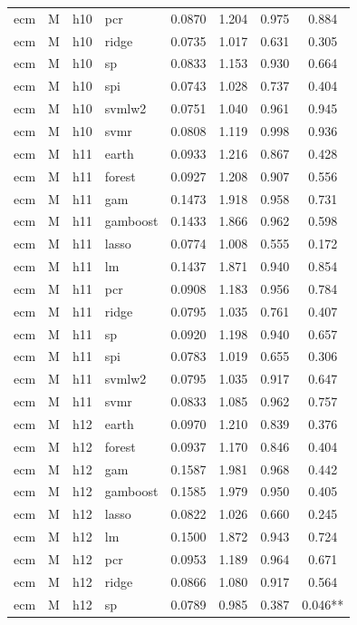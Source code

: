 \begin{ThreePartTable}
\begin{longtable}[t]{llclcccc}
ecm & M & h10 & pcr & 0.0870 & 1.204 & 0.975 & 0.884\\
ecm & M & h10 & ridge & 0.0735 & 1.017 & 0.631 & 0.305\\
ecm & M & h10 & sp & 0.0833 & 1.153 & 0.930 & 0.664\\
ecm & M & h10 & spi & 0.0743 & 1.028 & 0.737 & 0.404\\
ecm & M & h10 & svmlw2 & 0.0751 & 1.040 & 0.961 & 0.945\\
ecm & M & h10 & svmr & 0.0808 & 1.119 & 0.998 & 0.936\\
\addlinespace
ecm & M & h11 & earth & 0.0933 & 1.216 & 0.867 & 0.428\\
ecm & M & h11 & forest & 0.0927 & 1.208 & 0.907 & 0.556\\
ecm & M & h11 & gam & 0.1473 & 1.918 & 0.958 & 0.731\\
ecm & M & h11 & gamboost & 0.1433 & 1.866 & 0.962 & 0.598\\
ecm & M & h11 & lasso & 0.0774 & 1.008 & 0.555 & 0.172\\
ecm & M & h11 & lm & 0.1437 & 1.871 & 0.940 & 0.854\\
ecm & M & h11 & pcr & 0.0908 & 1.183 & 0.956 & 0.784\\
ecm & M & h11 & ridge & 0.0795 & 1.035 & 0.761 & 0.407\\
ecm & M & h11 & sp & 0.0920 & 1.198 & 0.940 & 0.657\\
ecm & M & h11 & spi & 0.0783 & 1.019 & 0.655 & 0.306\\
ecm & M & h11 & svmlw2 & 0.0795 & 1.035 & 0.917 & 0.647\\
ecm & M & h11 & svmr & 0.0833 & 1.085 & 0.962 & 0.757\\
\addlinespace
ecm & M & h12 & earth & 0.0970 & 1.210 & 0.839 & 0.376\\
ecm & M & h12 & forest & 0.0937 & 1.170 & 0.846 & 0.404\\
ecm & M & h12 & gam & 0.1587 & 1.981 & 0.968 & 0.442\\
ecm & M & h12 & gamboost & 0.1585 & 1.979 & 0.950 & 0.405\\
ecm & M & h12 & lasso & 0.0822 & 1.026 & 0.660 & 0.245\\
ecm & M & h12 & lm & 0.1500 & 1.872 & 0.943 & 0.724\\
ecm & M & h12 & pcr & 0.0953 & 1.189 & 0.964 & 0.671\\
ecm & M & h12 & ridge & 0.0866 & 1.080 & 0.917 & 0.564\\
ecm & M & h12 & sp & 0.0789 & 0.985 & 0.387 & 0.046**\\

\end{longtable}
\end{ThreePartTable}
